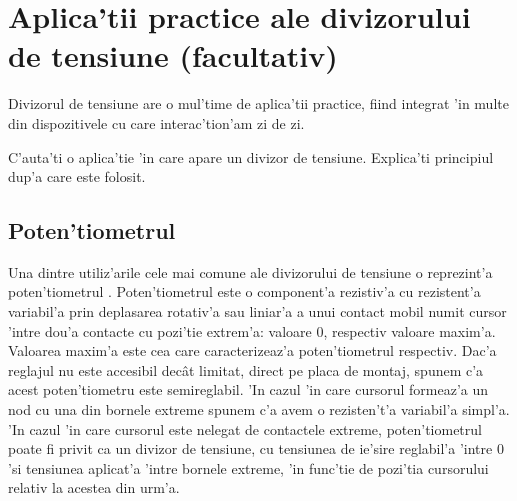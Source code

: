 \section[Aplica'tii practice ale divizorului de tensiune]{Aplica'tii practice ale divizorului de tensiune (facultativ)}

Divizorul de tensiune are o mul'time de aplica'tii practice, fiind integrat 'in multe din dispozitivele cu care interac'tion'am zi de zi.
\begin{exercise}
C'auta'ti o aplica'tie 'in care apare un divizor de tensiune. Explica'ti principiul dup'a care este folosit.
\end{exercise}

\subsection*{Poten'tiometrul}

Una dintre utiliz'arile cele mai comune ale divizorului de tensiune o reprezint'a poten'tiometrul \cite{aplicatii_potentiometru}. 
Poten'tiometrul este o component'a rezistiv'a cu rezistent'a variabil'a prin deplasarea rotativ'a sau liniar'a a unui contact mobil numit cursor 'intre dou'a contacte cu pozi'tie
extrem'a: valoare 0, respectiv valoare maxim'a. Valoarea maxim'a este cea care caracterizeaz'a
poten'tiometrul respectiv. Dac'a reglajul nu este accesibil dec\^at limitat, direct pe
placa de montaj, spunem c'a acest poten'tiometru este semireglabil. 'In cazul 'in care cursorul
formeaz'a un nod cu una din bornele extreme spunem c'a avem o rezisten't'a variabil'a simpl'a. 'In cazul 'in care cursorul este nelegat de contactele extreme, poten'tiometrul
poate fi privit ca un divizor de tensiune, cu tensiunea de ie'sire reglabil'a 'intre 0 'si tensiunea aplicat'a 'intre bornele extreme, 'in func'tie de pozi'tia cursorului relativ la acestea din urm'a.

%
%
%


